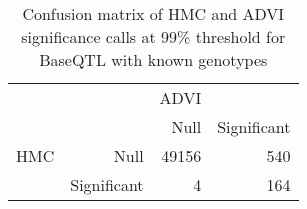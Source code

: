 \begin{table}[ht]
\centering
\caption{Confusion matrix of HMC and ADVI significance calls at 99\% threshold for BaseQTL with known genotypes} 
\label{tab:GT-xtab-99}
\begin{tabular}{rr|rr}
   &  & ADVI &  \\ 
    &   & Null & Significant \\ 
   \hline
HMC & Null & 49156 & 540 \\ 
    & Significant & 4 & 164 \\ 
  \end{tabular}
\end{table}
